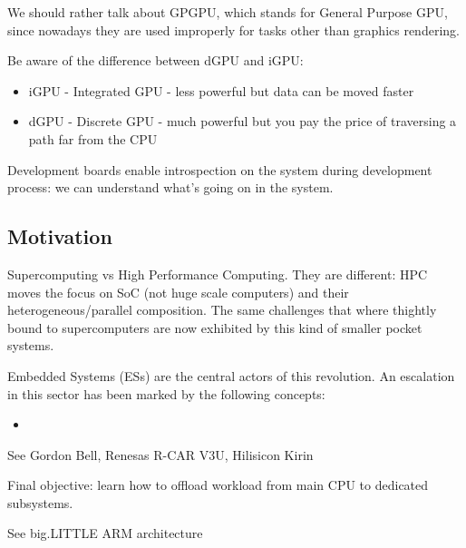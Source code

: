 We should rather talk about GPGPU, which stands for General Purpose GPU, since nowadays they are used improperly for tasks other than graphics rendering.

Be aware of the difference between dGPU and iGPU:
\begin{itemize}
  \item iGPU - Integrated GPU - less powerful but data can be moved faster
  \item dGPU - Discrete GPU - much powerful but you pay the price of traversing a path far from the CPU
\end{itemize}

Development boards enable introspection on the system during development process: we can understand what's going on in the system.

\subsection{Motivation}
Supercomputing vs High Performance Computing. They are different: HPC moves the focus on SoC (not huge scale computers) and their heterogeneous/parallel composition.
The same challenges that where thightly bound to supercomputers are now exhibited by this kind of smaller pocket systems.

Embedded Systems (ESs) are the central actors of this revolution. An escalation in this sector has been marked by the following concepts:
\begin{itemize}
  \item 
\end{itemize}

See Gordon Bell, Renesas R-CAR V3U, Hilisicon Kirin

Final objective: learn how to offload workload from main CPU to dedicated subsystems.

See big.LITTLE ARM architecture